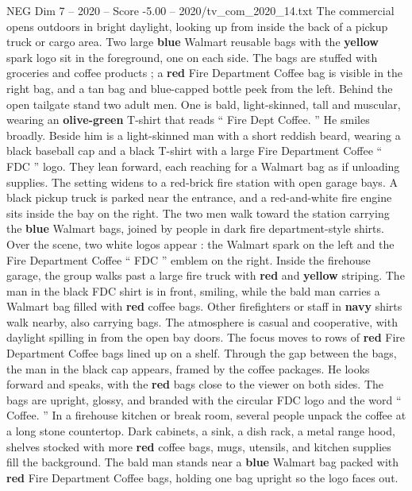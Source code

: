 \begin{textsample}{NEG Dim 7 – 2020 – Score -5.00 – 2020/tv\_com\_2020\_14.txt}  \label{ex:f7_neg_004}
The commercial opens outdoors in bright daylight, looking up from inside the back of a pickup truck or cargo area.
Two large \textbf{blue} Walmart reusable bags with the \textbf{yellow} spark logo sit in the foreground, one on each side.
The bags are stuffed with groceries and coffee products ; a \textbf{red} Fire Department Coffee bag is visible in the right bag, and a tan bag and blue-capped bottle peek from the left.
Behind the open tailgate stand two adult men.
One is bald, light-skinned, tall and muscular, wearing an \textbf{olive-green} T-shirt that reads “ Fire Dept Coffee. ” He smiles broadly.
Beside him is a light-skinned man with a short reddish beard, wearing a black baseball cap and a black T-shirt with a large Fire Department Coffee “ FDC ” logo.
They lean forward, each reaching for a Walmart bag as if unloading supplies.
The setting widens to a red-brick fire station with open garage bays.
A black pickup truck is parked near the entrance, and a red-and-white fire engine sits inside the bay on the right.
The two men walk toward the station carrying the \textbf{blue} Walmart bags, joined by people in dark fire department-style shirts.
Over the scene, two white logos appear : the Walmart spark on the left and the Fire Department Coffee “ FDC ” emblem on the right.
Inside the firehouse garage, the group walks past a large fire truck with \textbf{red} and \textbf{yellow} striping.
The man in the black FDC shirt is in front, smiling, while the bald man carries a Walmart bag filled with \textbf{red} coffee bags.
Other firefighters or staff in \textbf{navy} shirts walk nearby, also carrying bags.
The atmosphere is casual and cooperative, with daylight spilling in from the open bay doors.
The focus moves to rows of \textbf{red} Fire Department Coffee bags lined up on a shelf.
Through the gap between the bags, the man in the black cap appears, framed by the coffee packages.
He looks forward and speaks, with the \textbf{red} bags close to the viewer on both sides.
The bags are upright, glossy, and branded with the circular FDC logo and the word “ Coffee. ” In a firehouse kitchen or break room, several people unpack the coffee at a long stone countertop.
Dark cabinets, a sink, a dish rack, a metal range hood, shelves stocked with more \textbf{red} coffee bags, mugs, utensils, and kitchen supplies fill the background.
The bald man stands near a \textbf{blue} Walmart bag packed with \textbf{red} Fire Department Coffee bags, holding one bag upright so the logo faces out.

\end{textsample}

